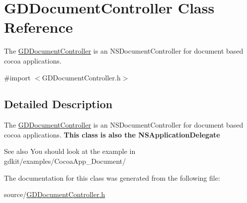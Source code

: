 \hypertarget{interface_g_d_document_controller}{
\section{GDDocumentController Class Reference}
\label{interface_g_d_document_controller}
}


The \hyperlink{interface_g_d_document_controller}{GDDocumentController} is an NSDocumentController for document based cocoa applications.  


{\ttfamily \#import $<$GDDocumentController.h$>$}

\subsection{Detailed Description}
The \hyperlink{interface_g_d_document_controller}{GDDocumentController} is an NSDocumentController for document based cocoa applications. {\bfseries This class is also the NSApplicationDelegate}

\begin{DoxySeeAlso}{See also}
You should look at the example in gdkit/examples/CocoaApp\_\-Document/ 
\end{DoxySeeAlso}


The documentation for this class was generated from the following file:\begin{DoxyCompactItemize}
\item 
source/\hyperlink{_g_d_document_controller_8h}{GDDocumentController.h}\end{DoxyCompactItemize}

